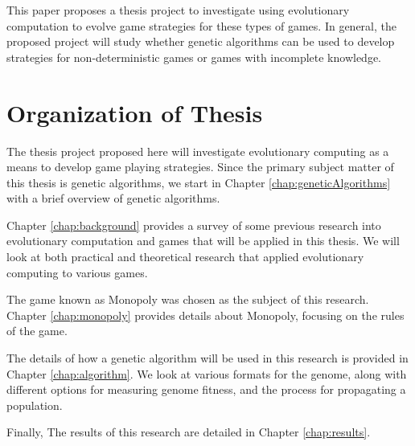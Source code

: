 This paper proposes a thesis project to investigate using evolutionary
computation to evolve game strategies for these types of games. In general, the
proposed project will study whether genetic algorithms can be used to develop
strategies for non-deterministic games or games with incomplete knowledge.

\section{Organization of Thesis}

The thesis project proposed here will investigate evolutionary computing as a
means to develop game playing strategies. Since the primary subject
matter of this thesis is genetic algorithms, we start in Chapter
\ref{chap:geneticAlgorithms} with a brief overview of genetic algorithms. 

Chapter \ref{chap:background} provides a survey of some previous research into
evolutionary computation and games that will be applied in this thesis. We will
look at both practical and theoretical research that applied evolutionary
computing to various games.

The game known as Monopoly was chosen as the subject of this research. Chapter
\ref{chap:monopoly} provides details about Monopoly, focusing on the rules of
the game.

The details of how a genetic algorithm will be used in this research is provided
in Chapter \ref{chap:algorithm}. We look at various formats for the genome,
along with different options for measuring genome fitness, and the process for
propagating a population.

Finally, The results of this research are detailed in Chapter
\ref{chap:results}.
